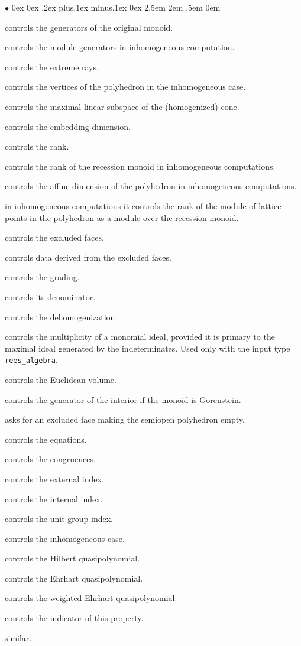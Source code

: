 \documentclass[12pt,a4paper]{scrartcl}
\newcommand{\stdli}{ \topsep0ex \partopsep0ex %
\parsep.2ex plus.1ex minus.1ex \itemsep0ex%
\leftmargin2.5em \labelwidth2em \labelsep.5em \rightmargin0em}%
\renewenvironment{itemize}{\begin{list}{{$\bullet$}}{\stdli}}{\end{list}}
\theoremstyle{definition}
\def\itemtt[#1]{\item[\textbf{\ttt{#1}}]}
\def\ttt{\texttt}
\begin{document}
\begin{itemize}
	
	\itemtt[OriginalMonoidGenerators] controls the generators of the original monoid.
	
	\itemtt[ModuleGenerators] controls the module generators in inhomogeneous computation.
	
	\itemtt[ExtremeRays] controls the extreme rays.
	
	\itemtt[VerticesOfPolyhedron] controls the vertices of the polyhedron in the inhomogeneous case.
	
	\itemtt[MaximalSubspace] controls the maximal linear subspace of the (homogenized) cone.
	
	\itemtt[EmbeddingDim] controls the embedding dimension.
	\itemtt[Rank] controls the rank.
	
	\itemtt[RecessionRank] controls the rank of the recession monoid in inhomogeneous computations.
	
	\itemtt[AffineDim] controls the affine dimension of the polyhedron in inhomogeneous computations.
	
	\itemtt[ModuleRank] in inhomogeneous computations it controls the rank of the module of lattice points in the polyhedron as a module over the recession monoid.
	
	\itemtt[ExcludedFaces] controls the excluded faces.
	
	\itemtt[InclusionExclusionData] controls data derived from the excluded faces.
	
	\itemtt[Grading] controls the grading.
	\itemtt[GradingDenom] controls its denominator.
	
	\itemtt[Dehomogenization] controls the dehomogenization.
	
	\itemtt[ReesPrimaryMultiplicity] controls the multiplicity of a monomial ideal, provided it is primary to the maximal ideal generated by the indeterminates. Used only with the input type \verb|rees_algebra|.
	
	\itemtt[EuclideanVolume]controls the Euclidean volume.
	
	\itemtt[GeneratorOfInterior] controls the generator of the interior if the monoid is Gorenstein.
	
	\itemtt[CoveringFace] asks for an excluded face making the semiopen polyhedron empty.
	
	\itemtt[Equations] controls the equations.
	\itemtt[Congruences] controls the congruences.
	\itemtt[ExternalIndex] controls the external index.
	\itemtt[InternalIndex] controls the internal index.
	\itemtt[UnitGroupIndex] controls the unit group index.
	
	
	\itemtt[IsInhomogeneous] controls the inhomogeneous case.
	
	\itemtt[HilbertQuasiPolynomial] controls the Hilbert quasipolynomial.
	\itemtt[EhrhartQuasiPolynomial] controls the Ehrhart quasipolynomial.
	
	\itemtt[WeightedEhrhartQuasiPolynomial] controls the weighted Ehrhart quasipolynomial.
	
	\itemtt[IsTriangulationNested] controls the indicator of this property.
	\itemtt[IsTriangulationPartial] similar.
	
\end{itemize}
\end{document}
